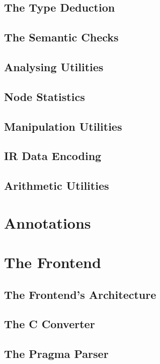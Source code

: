 \subsection{The Type Deduction}
\label{sec:Compiler.Core.TypeDeduction}
\subsection{The Semantic Checks}
\label{sec:Compiler.Core.SemanticChecks}
\subsection{Analysing Utilities}
\label{sec:Compiler.Core.Analysis}
\subsection{Node Statistics}
\label{sec:Compiler.Core.Statistics}
\subsection{Manipulation Utilities}
\label{sec:Compiler.Core.Manipulation}
\subsection{IR Data Encoding}
\label{sec:Compiler.Core.Encoding}
\subsection{Arithmetic Utilities}
\label{sec:Compiler.Core.Arithmetic}



\section{Annotations}

\section{The Frontend}
\subsection{The Frontend's Architecture}
\subsection{The C Converter}
\subsection{The Pragma Parser}
